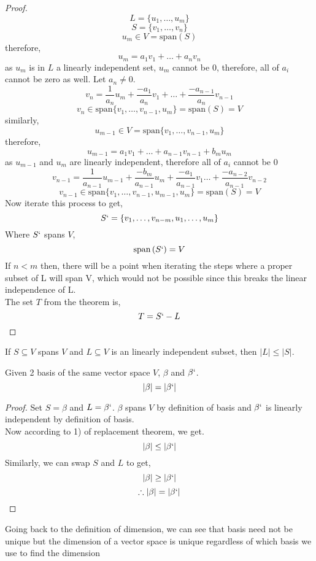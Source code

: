 \documentclass[11pt,a4paper]{colorart}
\def\l{\left}
\def\r{\right}
\def\b{\beta}
\begin{document}
\begin{proof}
	\[ L = \{ u_1,\dots,u_m\} \]
	\[ S = \{ v_1,\dots,v_n\} \]
	\[ u_m \in V = \text{span}\l(S\r) \]
	therefore,
	\[ u_m = a_1 v_1 + \dots + a_n v_n \]
	as $u_m$ is in $L$ a linearly independent set, $u_m$ cannot be $0$, therefore, all of $a_i$ cannot be zero as well. Let $a_n \neq 0$.
	\[ v_n = \frac{1}{a_n}u_m +\frac{-a_1}{a_n}v_1 +\dots + \frac{-a_{n-1}}{a_n}v_{n-1} \]
	\[ v_n \in \text{span}\{v_1,\dots,v_{n-1},u_m \} = \text{span}\l(S\r) = V \]
	similarly,
	\[ u_{m-1} \in V = \text{span}\{v_1,\dots,v_{n-1},u_m \}  \]
	therefore,
	\[ u_{m-1} = a_1 v_1 + \dots + a_{n-1} v_{n-1} + b_m u_m  \]
	as $u_{m-1}$ and $u_m$ are linearly independent, therefore all of $a_i$ cannot be $0$
	\[ v_{n-1} = \frac{1}{a_{n-1}}u_{m-1} +\frac{-b_m}{a_{n-1}}u_m + \frac{-a_1}{a_{n-1}} v_1 \dots + \frac{-a_{n-2}}{a_{n-1}}v_{n-2} \]
	\[ v_{n-1} \in \text{span}\{v_1,\dots,v_{n-1},u_{m-1},u_m \} = \text{span}\l(S\r) = V \]
	Now iterate this process to get,
	\[ S` = \{ v_1,\dots,v_{n-m},u_1,\dots,u_m \} \]
	Where $S`$ spans $V$,
	\[ \text{span}\l(S`\r) = V \]
	If $n<m$ then, there will be a point when iterating the steps where a proper subset of L will span V, which would not be possible since this breaks the linear independence of L.\\
	The set $T$ from the theorem is,
	\[ T = S` - L \]
\end{proof}

\begin{remark}
	If $S\subseteq V$ spans $V$ and $L\subseteq V$ is an linearly independent subset, then $|L|\leq |S|$.
\end{remark}

\begin{corollary}
	Given 2 basis of the same vector space $V$, $\b$ and $\b`$.
	\[ |\b|=|\b`|\]
\end{corollary}

\begin{proof}
	Set $S = \b$ and $L = \b`$. $\b$ spans $V$ by definition of basis and $\b`$ is linearly independent by definition of basis.\\
	Now according to 1) of replacement theorem, we get.
	\[ |\b| \leq |\b`| \]
	Similarly, we can swap $S$ and $L$ to get,
	\[ |\b| \geq |\b`| \]
	\[ \therefore |\b| = |\b`| \]
\end{proof}

\begin{remark}
	Going back to the definition of dimension, we can see that basis need not be unique but the dimension of a vector space is unique regardless of which basis we use to find the dimension
\end{remark}
\end{document}
